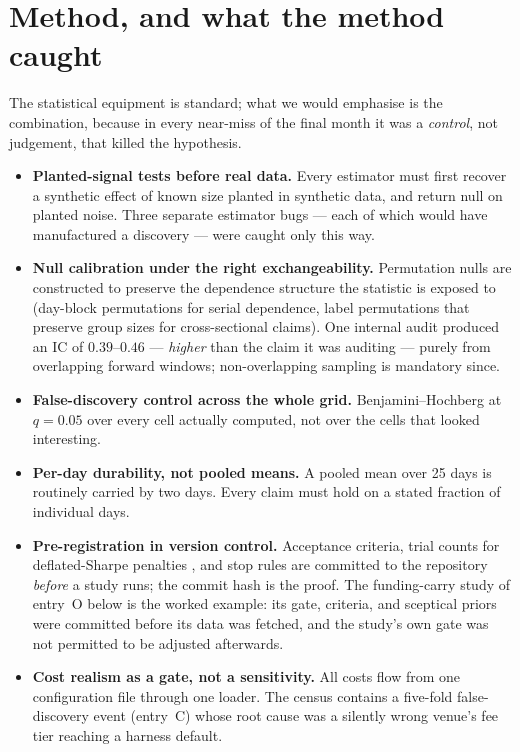 \documentclass[11pt,a4paper]{article}
\begin{document}
\section{Method, and what the method caught}
\label{sec:method}

The statistical equipment is standard; what we would emphasise is the
combination, because in every near-miss of the final month it was a
\emph{control}, not judgement, that killed the hypothesis.

\begin{itemize}
\item \textbf{Planted-signal tests before real data.} Every estimator
must first recover a synthetic effect of known size planted in
synthetic data, and return null on planted noise. Three separate
estimator bugs --- each of which would have manufactured a discovery
--- were caught only this way.
\item \textbf{Null calibration under the right exchangeability.}
Permutation nulls are constructed to preserve the dependence structure
the statistic is exposed to (day-block permutations for serial
dependence, label permutations that preserve group sizes for
cross-sectional claims). One internal audit produced an IC of
$0.39$--$0.46$ --- \emph{higher} than the claim it was auditing ---
purely from overlapping forward windows; non-overlapping sampling is
mandatory since.
\item \textbf{False-discovery control across the whole grid.}
Benjamini--Hochberg at $q=0.05$ over every cell actually computed, not
over the cells that looked interesting.
\item \textbf{Per-day durability, not pooled means.} A pooled mean
over 25 days is routinely carried by two days. Every claim must hold on
a stated fraction of individual days.
\item \textbf{Pre-registration in version control.} Acceptance
criteria, trial counts for deflated-Sharpe penalties
\citep[in the sense of][]{bailey2014}, and stop rules are committed to
the repository \emph{before} a study runs; the commit hash is the
proof. The funding-carry study of entry~O below is the worked example:
its gate, criteria, and sceptical priors were committed before its
data was fetched, and the study's own gate was not permitted to be
adjusted afterwards.
\item \textbf{Cost realism as a gate, not a sensitivity.} All costs
flow from one configuration file through one loader. The census
contains a five-fold false-discovery event (entry~C) whose root cause
was a silently wrong venue's fee tier reaching a harness default.
\end{itemize}
\end{document}

